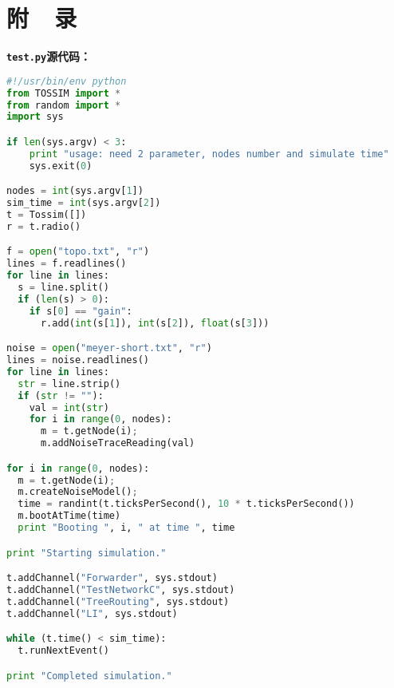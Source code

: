 \chapter*{附~~录}
\noindent\bfseries\texttt{test.py}源代码：
\setmonofont{Monaco}
\begin{lstlisting}[language=Python]
#!/usr/bin/env python
from TOSSIM import *
from random import *
import sys

if len(sys.argv) < 3:
	print "usage: need 2 parameter, nodes number and simulate time"
	sys.exit(0)

nodes = int(sys.argv[1])
sim_time = int(sys.argv[2])
t = Tossim([])
r = t.radio()

f = open("topo.txt", "r")
lines = f.readlines()
for line in lines:
  s = line.split()
  if (len(s) > 0):
    if s[0] == "gain":
      r.add(int(s[1]), int(s[2]), float(s[3]))

noise = open("meyer-short.txt", "r")
lines = noise.readlines()
for line in lines:
  str = line.strip()
  if (str != ""):
    val = int(str)
    for i in range(0, nodes):
      m = t.getNode(i);
      m.addNoiseTraceReading(val)

for i in range(0, nodes):
  m = t.getNode(i);
  m.createNoiseModel();
  time = randint(t.ticksPerSecond(), 10 * t.ticksPerSecond())
  m.bootAtTime(time)
  print "Booting ", i, " at time ", time

print "Starting simulation."

t.addChannel("Forwarder", sys.stdout)
t.addChannel("TestNetworkC", sys.stdout)
t.addChannel("TreeRouting", sys.stdout)
t.addChannel("LI", sys.stdout)

while (t.time() < sim_time):
  t.runNextEvent()

print "Completed simulation."
\end{lstlisting}

